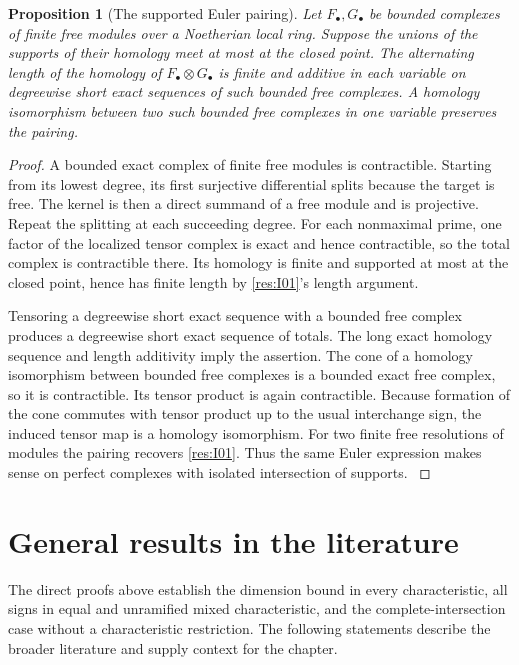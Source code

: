 \documentclass[11pt,oneside,openany]{book}
\newtheorem{proposition}[theorem]{Proposition}
\theoremstyle{definition}
\theoremstyle{remark}
\begin{document}
\begin{proposition}[The supported Euler pairing]\label{res:I17}
Let \(F_\bullet,G_\bullet\) be bounded complexes of finite
free modules over a Noetherian local ring. Suppose the unions
of the supports of their homology meet at most at the closed
point. The alternating length of the homology of
\(F_\bullet\otimes G_\bullet\) is finite and additive in
each variable on degreewise short exact sequences of such
bounded free complexes. A homology isomorphism between two
such bounded free complexes in one variable preserves the
pairing.
\end{proposition}
\begin{proof}
A bounded exact complex of finite free modules is contractible.
Starting from its lowest degree, its first surjective
differential splits because the target is free. The kernel is
then a direct summand of a free module and is projective.
Repeat the splitting at each succeeding degree. For each
nonmaximal prime, one factor of the localized tensor complex
is exact and hence contractible, so the total complex is
contractible there. Its homology is finite and supported at
most at the closed point, hence has finite length by
\ref{res:I01}'s length argument.

Tensoring a degreewise short exact sequence with a bounded free
complex produces a degreewise short exact sequence of totals.
The long exact homology sequence and length additivity imply
the assertion. The cone of a homology isomorphism between
bounded free complexes is a bounded exact free complex, so
it is contractible. Its tensor product is again contractible.
Because formation of the cone commutes with tensor product
up to the usual interchange sign, the induced tensor map
is a homology isomorphism. For two finite free resolutions
of modules the pairing recovers \ref{res:I01}. Thus the
same Euler expression makes sense on perfect complexes
with isolated intersection of supports.
\cite[Chapter 5, \S 5.3, and Chapter 11]{roberts}
\end{proof}

\section{General results in the literature}

The direct proofs above establish the dimension bound
in every characteristic, all signs in equal and unramified
mixed characteristic, and the complete-intersection case without
a characteristic restriction. The following statements describe
the broader literature and supply context for the chapter.
\end{document}
